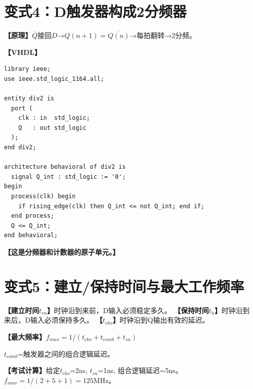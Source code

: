 \section{变式4：D触发器构成2分频器}

\begin{detailbox}[完整教学]
\textbf{【原理】}$\overline{Q}$接回$D$→$Q(n+1)=\overline{Q(n)}$→每拍翻转→2分频。

\textbf{【VHDL】}
\begin{lstlisting}[caption={2分频器（D触发器自反馈）}]
library ieee;
use ieee.std_logic_1164.all;

entity div2 is
  port (
    clk : in  std_logic;
    Q   : out std_logic
  );
end div2;

architecture behavioral of div2 is
  signal Q_int : std_logic := '0';
begin
  process(clk) begin
    if rising_edge(clk) then Q_int <= not Q_int; end if;
  end process;
  Q <= Q_int;
end behavioral;
\end{lstlisting}

\textbf{【这是分频器和计数器的原子单元。】}
\end{detailbox}


\section{变式5：建立/保持时间与最大工作频率}

\begin{detailbox}[完整教学]
\textbf{【建立时间$t_{su}$】}时钟沿到来前，D输入必须稳定多久。
\textbf{【保持时间$t_h$】}时钟沿到来后，D输入必须保持多久。
\textbf{【$t_{cko}$】}时钟沿到Q输出有效的延迟。

\textbf{【最大频率】}$f_{max} = 1/(t_{cko} + t_{comb} + t_{su})$

$t_{comb}$=触发器之间的组合逻辑延迟。

\textbf{【考试计算】}给定$t_{cko}$=2ns, $t_{su}$=1ns, 组合逻辑延迟=5ns。
$f_{max}=1/(2+5+1)=125$MHz。
\end{detailbox}
